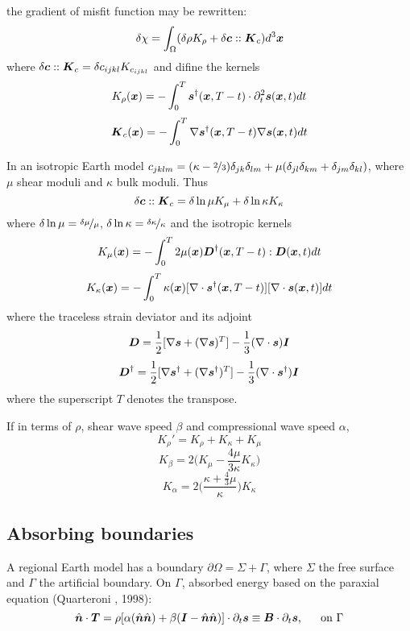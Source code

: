 the gradient of misfit function may be rewritten:
\[ \delta\chi=\int_\Omega(\delta\rho K_\rho+\delta\boldsymbol{c}::\boldsymbol{K}_c)d^3\boldsymbol{x} \]
where $\delta\boldsymbol{c}::\boldsymbol{K}_c=\delta c_{ijkl}K_{c_{ijkl}}$ and difine the kernels
\[ K_\rho(\boldsymbol{x})=-\int_0^T\boldsymbol{s}^\dagger(\boldsymbol{x},T-t)\cdot\partial_t^2\boldsymbol{s}(\boldsymbol{x},t)dt \]
\[ \boldsymbol{K}_c(\boldsymbol{x})=-\int_0^T\nabla\boldsymbol{s}^\dagger(\boldsymbol{x},T-t)\nabla\boldsymbol{s}(\boldsymbol{x},t)dt \]

In an isotropic Earth model
$c_{jklm}=(\kappa-\nicefrac{2}{3})\delta_{jk}\delta_{lm}+\mu(\delta_{jl}\delta_{km}+\delta_{jm}\delta_{kl})$,
where $\mu$ shear moduli and $\kappa$ bulk moduli.
Thus
\[ \delta\boldsymbol{c}::\boldsymbol{K}_c=\delta\ln\mu K_\mu+\delta\ln\kappa K_\kappa \]
where $\delta\ln\mu=\nicefrac{\delta\mu}{\mu}$, $\delta\ln\kappa=\nicefrac{\delta\kappa}{\kappa}$
and the isotropic kernels
\[ K_\mu(\boldsymbol{x})=-\int_0^T2\mu(\boldsymbol{x})\boldsymbol{D}^\dagger(\boldsymbol{x},T-t):\boldsymbol{D}(\boldsymbol{x},t)dt \]
\[ K_\kappa(\boldsymbol{x})=-\int_0^T\kappa(\boldsymbol{x})[\nabla\cdot\boldsymbol{s}^\dagger(\boldsymbol{x},T-t)][\nabla\cdot\boldsymbol{s}(\boldsymbol{x},t)]dt \]
where the traceless strain deviator and its adjoint
\[ \boldsymbol{D}=\frac{1}{2}[\nabla\boldsymbol{s}+(\nabla\boldsymbol{s})^T]-\frac{1}{3}(\nabla\cdot\boldsymbol{s})\boldsymbol{I} \]
\[ \boldsymbol{D}^\dagger=\frac{1}{2}[\nabla\boldsymbol{s}^\dagger+(\nabla\boldsymbol{s}^\dagger)^T]-\frac{1}{3}(\nabla\cdot\boldsymbol{s}^\dagger)\boldsymbol{I} \]
where the superscript $T$ denotes the transpose.

If in terms of $\rho$, shear wave speed $\beta$ and compressional wave speed $\alpha$,
\[ K_\rho'=K_\rho+K_\kappa+K_\mu \]
\[ K_\beta=2\Big(K_\mu-\frac{4\mu}{3\kappa}K_\kappa\Big) \]
\[ K_\alpha=2\bigg(\frac{\kappa+\frac{4}{3}\mu}{\kappa}\bigg)K_\kappa \]

\subsection{Absorbing boundaries}
A regional Earth model has a boundary $\partial\Omega=\Sigma+\Gamma$,
where $\Sigma$ the free surface and $\Gamma$ the artificial boundary.
On $\Gamma$, absorbed energy based on the paraxial equation (Quarteroni \etal, 1998):
\[ \hat{\boldsymbol{n}}\cdot\boldsymbol{T}=\rho[\alpha(\hat{\boldsymbol{n}}\hat{\boldsymbol{n}})+\beta(\boldsymbol{I}-\hat{\boldsymbol{n}}\hat{\boldsymbol{n}})]\cdot\partial_t\boldsymbol{s}\equiv\boldsymbol{B}\cdot\partial_t\boldsymbol{s} \text{,\hspace{5mm} on } \Gamma \]

